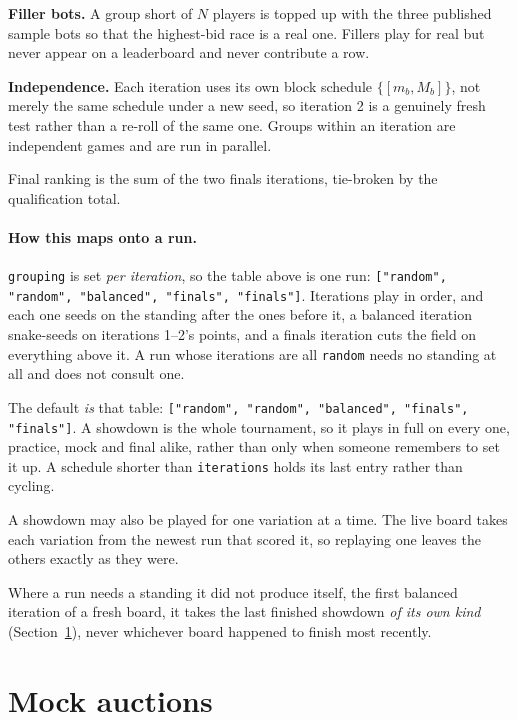\documentclass[11pt,a4paper]{article}
\newcommand{\code}[1]{\texttt{\small #1}}
\begin{document}
\textbf{Filler bots.} A group short of $N$ players is topped up with the three
published sample bots so that the highest-bid race is a real one. Fillers play
for real but never appear on a leaderboard and never contribute a row.

\textbf{Independence.} Each iteration uses its own block schedule
$\{[m_b, M_b]\}$, not merely the same schedule under a new seed, so iteration 2
is a genuinely fresh test rather than a re-roll of the same one. Groups within
an iteration are independent games and are run in parallel.

Final ranking is the sum of the two finals iterations, tie-broken by the
qualification total.

\paragraph{How this maps onto a run.}
\code{grouping} is set \emph{per iteration}, so the table above is one run:
\code{["random", "random", "balanced", "finals", "finals"]}. Iterations play in
order, and each one seeds on the standing after the ones before it, a
balanced iteration snake-seeds on iterations 1--2's points, and a finals
iteration cuts the field on everything above it. A run whose iterations are all
\code{random} needs no standing at all and does not consult one.

The default \emph{is} that table:
\code{["random", "random", "balanced", "finals", "finals"]}. A showdown is the
whole tournament, so it plays in full on every one, practice, mock and final
alike, rather than only when someone remembers to set it up. A schedule shorter
than \code{iterations} holds its last entry rather than cycling.

A showdown may also be played for one variation at a time. The live board takes
each variation from the newest run that scored it, so replaying one leaves the
others exactly as they were.

Where a run needs a standing it did not produce itself, the first balanced
iteration of a fresh board, it takes the last finished showdown \emph{of its
own kind} (Section~\ref{sec:mock}), never whichever board happened to finish
most recently.

\section{Mock auctions}
\label{sec:mock}
\end{document}
